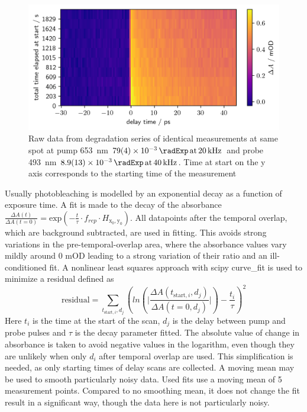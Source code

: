 \documentclass[twoside,openright,listof=numbered]{scrreprt}
\def\pumpExp#1{\ensuremath{\SI{#1}{\radExp}\,\mathrm{at}\, \SI{20}{\kilo\hertz}}}
\def\probeExp#1{\ensuremath{\SI{#1}{\radExp}\,\mathrm{at}\, \SI{40}{\kilo\hertz}}}
\def\radiantExp{\ensuremath{H_\mathrm{x_0,y_0}}}
\begin{document}
\begin{figure}[hbtp]
\centering
\includegraphics[width=\linewidth]{images/DegradationRAWPump653Probe493.png}
\caption[Raw data from degradation series of identical measurements at same spot at pump \SI{653}{\nano\meter} and probe \SI{493}{\nano\meter}.]{Raw data from degradation series of identical measurements at same spot at pump \SI{653}{\nano\meter} \pumpExp{79(4)e-3} and probe \SI{493}{\nano\meter} \probeExp{8.9(1.3)e-3}.
Time at start on the y axis corresponds to the starting time of the measurement\label{fig:rawDegradation}}
\end{figure}
Usually photobleaching is modelled by an exponential decay as a function of exposure time. A fit is made to the decay of the absorbance $\frac{\Delta A\left(t\right)}{\Delta A\left(t=0\right)} = \mathrm{exp}\left(-\frac{t}{\tau}\cdot f_{rep}\cdot\radiantExp\right)$.
All datapoints after the temporal overlap, which are background subtracted, are used in fitting. This avoids strong variations in the pre-temporal-overlap area, where the absorbance values vary mildly around 0 mOD leading to a strong variation of their ratio and an ill-conditioned fit. A nonlinear least squares approach with scipy curve\_fit is used to minimize a residual defined as
\begin{equation}\label{eq:degradationFitting}
\mathrm{residual} = \sum_{t_{\text{start},i},d_j} \left(ln\left(\lvert\frac{\Delta A(t_{\text{start},i},d_j)}{\Delta A(t=0,d_j)}\rvert\right)- \frac{t_i}{\tau}\right)^2
\end{equation}
Here $t_i$ is the time at the start of the scan, $d_j$ is the delay between pump and probe pulses and $\tau$ is the decay parameter fitted. The absolute value of change in absorbance is taken to avoid negative values in the logarithm, even though they are unlikely when only $d_i$ after temporal overlap are used.  This simplification is needed, as only starting times of delay scans are collected. A moving mean may be used to smooth particularly noisy data. Used fits use a moving mean of 5 measurement points. Compared to no smoothing mean, it does not change the fit result in a significant way, though the data here is not particularly noisy.\\
\end{document}
